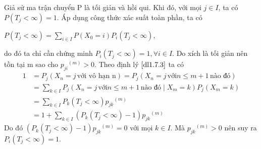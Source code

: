 \dl\label{dl1.7.7}
Giả sử ma trận chuyển P là tối giản và hồi qui. Khi đó, với mọi $j \in I$, ta có $P(T_j < \infty) = 1.$
\hdl
\cm
Áp dụng công thức xác suất toàn phần, ta có
\begin{center}
$P(T_j < \infty) = \sum_{i\in I}{P(X_0 = i)P_i(T_j < \infty)},$
\end{center}
do đó ta chỉ cần chứng minh $P_i(T_j < \infty) = 1,\forall i \in I.$ Do xích là tối giản nên tồn tại m sao cho ${p_{ji}}^{(m)} > 0.$ Theo định lý $\eqref{dl1.7.3}$ ta có
\begin{align*} 
1 &=  P_j(X_n = j \,\text{với vô hạn n}) = P_j(X_n = j \,\text{với} n \leq m+1 \,\text{nào đó})\\
&=\sum_{k \in I}{P_j(X_n=j \,\text{với} n \leq m+1 \,\text{nào đó} \mid X_m = k)P_j(X_m=k)}\\
&=\sum_{k \in I}{P_k(T_j < \infty){p_{jk}}^{(m)}} \\
&= 1 + \sum_{k\in I}{(P_k(T_j < \infty)-1){p_{jk}}^{(m)}}
\end{align*}
Do đó $(P_k(T_j < \infty)-1){p_{jk}}^{(m)} = 0$ với mọi $k \in I$. Mà ${p_{jk}}^{(m)} >0 $ nên suy ra $P_i(T_j < \infty) = 1.$








